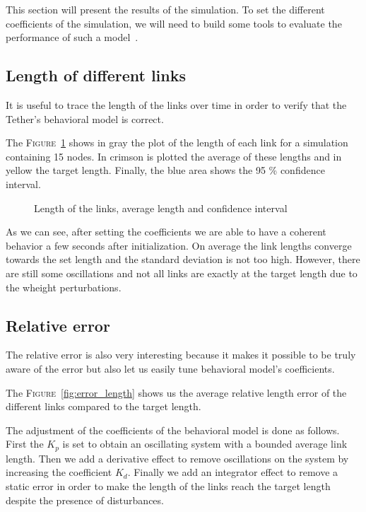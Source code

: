 This section will present the results of the simulation. To set the different coefficients of the simulation, we will need to build some tools to evaluate the performance of such a model~\cite{ellis_modeling_nodate}.

\subsection{Length of different links}

It is useful to trace the length of the links over time in order to verify that the Tether's behavioral model is correct.

The \textsc{Figure}~\ref{fig:length} shows in gray the plot of the length of each link for a simulation containing 15 nodes. In crimson is plotted the average of these lengths and in yellow the target length. Finally, the blue area shows the 95 \% confidence interval.

\begin{figure}[!htb]
    \centering
    
    \caption{Length of the links, average length and confidence interval}
    \label{fig:length}
\end{figure}

As we can see, after setting the coefficients we are able to have a coherent behavior a few seconds after initialization. On average the link lengths converge towards the set length and the standard deviation is not too high. However, there are still some oscillations and not all links are exactly at the target length due to the wheight perturbations.

\subsection{Relative error}
The relative error is also very interesting because it makes it possible to be truly aware of the error but also let us easily tune behavioral model's coefficients.

The \textsc{Figure}~\ref{fig:error_length} shows us the average relative length error of the different links compared to the target length.

The adjustment of the coefficients of the behavioral model is done as follows. First the $K_p$ is set to obtain an oscillating system with a bounded average link length. Then we add a derivative effect to remove oscillations on the system by increasing the coefficient $K_d$. Finally we add an integrator effect to remove a static error in order to make the length of the links reach the target length despite the presence of disturbances.

